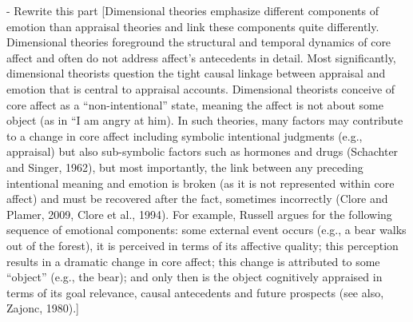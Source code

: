\documentclass[11pt]{article}
\begin{document}
- Rewrite this part [Dimensional theories emphasize different components of
emotion than appraisal theories and link these components quite differently.
Dimensional theories foreground the structural and temporal dynamics of core
affect and often do not address affect’s antecedents in detail. Most
significantly, dimensional theorists question the tight causal linkage between
appraisal and emotion that is central to appraisal accounts. Dimensional
theorists conceive of core affect as a “non-intentional” state, meaning the
affect is not about some object (as in “I am angry at him). In such theories,
many factors may contribute to a change in core affect including symbolic
intentional judgments (e.g., appraisal) but also sub-symbolic factors such as
hormones and drugs (Schachter and Singer, 1962), but most importantly, the link
between any preceding intentional meaning and emotion is broken (as it is not
represented within core affect) and must be recovered after the fact, sometimes
incorrectly (Clore and Plamer, 2009, Clore et al., 1994). For example, Russell
argues for the following sequence of emotional components: some external event
occurs (e.g., a bear walks out of the forest), it is perceived in terms of its
affective quality; this perception results in a dramatic change in core affect;
this change is attributed to some “object” (e.g., the bear); and only then is
the object cognitively appraised in terms of its goal relevance, causal
antecedents and future prospects (see also, Zajonc, 1980).]
\end{document}
